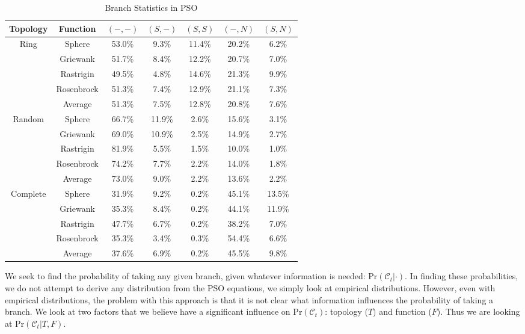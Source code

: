 \documentclass[ms,electronic,twosidetoc,letterpaper,chaptercenter,parttop,equalmargins]{byumsphd}
\providecommand{\caseset}{\ensuremath{\mathcal{C}}}
\providecommand{\casexn}{\ensuremath{(S,-)}}
\providecommand{\casexx}{\ensuremath{(S,S)}}
\providecommand{\casepn}{\ensuremath{(-,-)}}
\providecommand{\casepN}{\ensuremath{(-,N)}}
\providecommand{\casexN}{\ensuremath{(S,N)}}
\providecommand{\prob}{\ensuremath{\mathrm{Pr}}}
\begin{document}
\begin{table}[ht]
  \caption{Branch Statistics in PSO}
  \label{tab:stats}
  \centering
  \scriptsize
  \begin{tabular}{c|c|c|c|c|c|c|}
	Topology&Function&\casepn&\casexn&\casexx&\casepN&\casexN\\
	\hline
	\hline
	Ring&Sphere&53.0\%&9.3\%&11.4\%&20.2\%&6.2\%\\
	&Griewank&51.7\%&8.4\%&12.2\%&20.7\%&7.0\%\\
	&Rastrigin&49.5\%&4.8\%&14.6\%&21.3\%&9.9\%\\
	&Rosenbrock&51.3\%&7.4\%&12.9\%&21.1\%&7.3\%\\
	\cline{2-7}
	&Average&{51.3\%}&{7.5\%}&{12.8\%}&{20.8\%}&
	{7.6\%}\\
	\hline
	\hline
	Random&Sphere&66.7\%&11.9\%&2.6\%&15.6\%&3.1\%\\
	&Griewank&69.0\%&10.9\%&2.5\%&14.9\%&2.7\%\\
	&Rastrigin&81.9\%&5.5\%&1.5\%&10.0\%&1.0\%\\
	&Rosenbrock&74.2\%&7.7\%&2.2\%&14.0\%&1.8\%\\
	\cline{2-7}
	&Average&{73.0\%}&{9.0\%}&{2.2\%}&{13.6\%}&
	{2.2\%}\\
	\hline
	\hline
	Complete&Sphere&31.9\%&9.2\%&0.2\%&45.1\%&13.5\%\\
	&Griewank&35.3\%&8.4\%&0.2\%&44.1\%&11.9\%\\
	&Rastrigin&47.7\%&6.7\%&0.2\%&38.2\%&7.0\%\\
	&Rosenbrock&35.3\%&3.4\%&0.3\%&54.4\%&6.6\%\\
	\cline{2-7}
	&Average&{37.6\%}&{6.9\%}&{0.2\%}&{45.5\%}&
	{9.8\%}\\
	\hline
  \end{tabular}
\end{table}

We seek to find the probability of taking any given branch, given whatever
information is needed: $\prob(\caseset_t|\cdot)$.  In finding these
probabilities, we do not attempt to derive any distribution from the PSO
equations, we simply look at empirical distributions.  However, even with
empirical distributions, the problem with this approach is that it is not clear
what information influences the probability of taking a branch.  We look at two
factors that we believe have a significant influence on $\prob(\caseset_t)$:
topology ($T$) and function ($F$).  Thus we are looking at
$\prob(\caseset_t|T,F)$.
\end{document}
